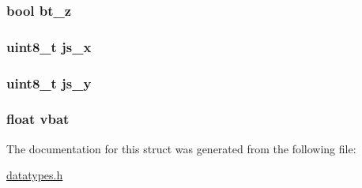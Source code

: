 \subsubsection[{bt\+\_\+z}]{\setlength{\rightskip}{0pt plus 5cm}bool bt\+\_\+z}\label{structmote__state_a33ceb865cadc673b73d6c1ac14ab39e5}
\hypertarget{structmote__state_a00d9e512b370d0eb769ea2ebc9a0728a}{}
\subsubsection[{js\+\_\+x}]{\setlength{\rightskip}{0pt plus 5cm}uint8\+\_\+t js\+\_\+x}\label{structmote__state_a00d9e512b370d0eb769ea2ebc9a0728a}
\hypertarget{structmote__state_a9e34e0672b4949584cefd0ec606cda65}{}
\subsubsection[{js\+\_\+y}]{\setlength{\rightskip}{0pt plus 5cm}uint8\+\_\+t js\+\_\+y}\label{structmote__state_a9e34e0672b4949584cefd0ec606cda65}
\hypertarget{structmote__state_ab3fe37f9db3ea1d893a6e9d411c5a2e8}{}
\subsubsection[{vbat}]{\setlength{\rightskip}{0pt plus 5cm}float vbat}\label{structmote__state_ab3fe37f9db3ea1d893a6e9d411c5a2e8}


The documentation for this struct was generated from the following file\+:\begin{DoxyCompactItemize}
\item 
\hyperlink{datatypes_8h}{datatypes.\+h}\end{DoxyCompactItemize}
